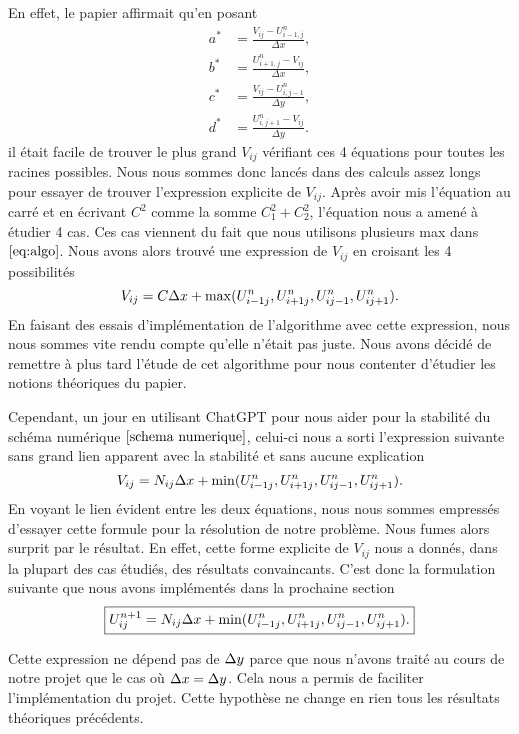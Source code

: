En effet, le papier affirmait qu'en posant 
\[
\begin{aligned}
a^* &= \frac{V_{ij} - U^n_{i-1,j}}{\Delta x}, \\
b^* &= \frac{U^n_{i+1,j} - V_{ij}}{\Delta x}, \\
c^* &= \frac{V_{ij} - U^n_{i,j-1}}{\Delta y}, \\
d^* &= \frac{U^n_{i,j+1} - V_{ij}}{\Delta y}.
\end{aligned}
\]
il était facile de trouver le plus grand $V_{ij}$ vérifiant ces 4 équations pour toutes les racines possibles. Nous nous sommes donc lancés dans des calculs assez longs pour essayer de trouver l'expression explicite de $V_{ij}$. Après avoir mis l'équation au carré et en écrivant $C^2$ comme la somme $C_1^2 + C_2^2$, l’équation nous a amené à étudier 4 cas. Ces cas viennent du fait que nous utilisons plusieurs \og max \fg{}  dans $\eqref{eq:algo}$. Nous avons alors trouvé une expression de $V_{ij}$ en croisant les 4 possibilités 
\begin{equation*}
    V_{ij} = C\Delta x + \max(U_{i-1j}^n,U_{i+1j}^n,U_{ij-1}^n,U_{ij+1}^n).
\end{equation*}
En faisant des essais d'implémentation de l'algorithme avec cette expression, nous nous sommes vite rendu compte qu'elle n'était pas juste. Nous avons décidé de remettre à plus tard l'étude de cet algorithme pour nous contenter d'étudier les notions théoriques du papier.

Cependant, un jour en utilisant ChatGPT pour nous aider pour la stabilité du schéma numérique $\eqref{schema numerique}$, celui-ci nous a sorti l'expression suivante sans grand lien apparent avec la stabilité et sans aucune explication
\begin{equation*}
    V_{ij} = N_{ij}\Delta x + \min(U_{i-1j}^n,U_{i+1j}^n,U_{ij-1}^n,U_{ij+1}^n).
\end{equation*}
En voyant le lien évident entre les deux équations, nous nous sommes empressés d'essayer cette formule pour la résolution de notre problème. Nous fumes alors surprit par le résultat. En effet, cette forme explicite de $V_{ij}$ nous a donnés, dans la plupart des cas étudiés, des résultats convaincants. C'est donc la formulation suivante que nous avons implémentés dans la prochaine section
\begin{equation}\label{algo_papier}
    \boxed{ U^{n+1}_{ij} = N_{ij}\Delta x + \min(U_{i-1j}^n,U_{i+1j}^n,U_{ij-1}^n,U_{ij+1}^n).}
\end{equation}

\begin{noremark}
    Cette expression ne dépend pas de $\Delta y$ parce que nous n'avons traité au cours de notre projet que le cas où $\Delta x=\Delta y$. Cela nous a permis de faciliter l'implémentation du projet. Cette hypothèse ne change en rien tous les résultats théoriques précédents.
\end{noremark}

